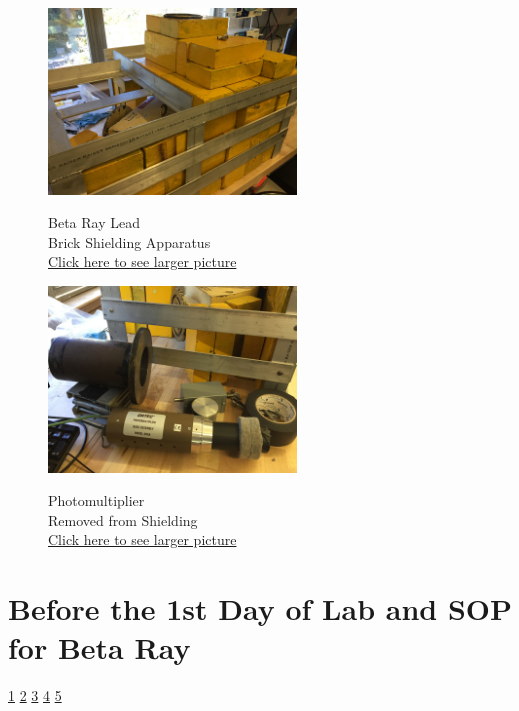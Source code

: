 \documentclass{../lab}
\begin{document}
\begin{figure}[H]
\captionsetup{justification=centering}
\centering
  \href{http://experimentationlab.berkeley.edu/sites/default/files/images/Lead_Brick_Shield.JPG}{\includegraphics[height=140pt,keepaspectratio]{images/Lead_Brick_Shield.JPG}}
  \caption{Beta Ray Lead\\ Brick Shielding Apparatus \\ \href{http://experimentationlab.berkeley.edu/sites/default/files/images/Lead_Brick_Shield.JPG}{Click here to see larger picture}}
  \label{fig:BRayBlock}
\endminipage\hfill
{}
\centering
 \href{http://experimentationlab.berkeley.edu/sites/default/files/images/Photomultiplier_Base.JPG}{\includegraphics[height=140pt,keepaspectratio]{images/Photomultiplier_Base.JPG}}
  \caption{Photomultiplier \\ Removed from Shielding \\ \href{http://experimentationlab.berkeley.edu/sites/default/files/images/Photomultiplier_Base.JPG}{Click here to see larger picture}}\label{fig:BRayApparatus}
\endminipage
\end{figure}

\section{Before the 1st Day of Lab and SOP for Beta Ray}

\signatures \hyperlink{LabView}{1} \hyperlink{Scope Image}{2} \hyperlink{Statistical Fluctuations}{3} \hyperlink{Hysteresis}{4} \hyperlink{Combined Fermi-Kurie Plot}{5} 
\end{document}
